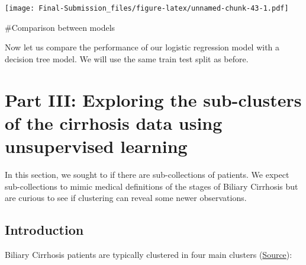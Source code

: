 \documentclass[
]{article}
\newenvironment{Shaded}{\begin{snugshade}}{\end{snugshade}}
\newcommand{\AttributeTok}[1]{\textcolor[rgb]{0.13,0.29,0.53}{#1}}
\newcommand{\CommentTok}[1]{\textcolor[rgb]{0.56,0.35,0.01}{\textit{#1}}}
\newcommand{\ConstantTok}[1]{\textcolor[rgb]{0.56,0.35,0.01}{#1}}
\newcommand{\DecValTok}[1]{\textcolor[rgb]{0.00,0.00,0.81}{#1}}
\newcommand{\FunctionTok}[1]{\textcolor[rgb]{0.13,0.29,0.53}{\textbf{#1}}}
\newcommand{\NormalTok}[1]{#1}
\newcommand{\SpecialCharTok}[1]{\textcolor[rgb]{0.81,0.36,0.00}{\textbf{#1}}}
\newcommand{\StringTok}[1]{\textcolor[rgb]{0.31,0.60,0.02}{#1}}
\begin{document}
\begin{Shaded}
\end{Shaded}

\texttt{[image: Final-Submission\_files/figure-latex/unnamed-chunk-43-1.pdf]}

\#Comparison between models

Now let us compare the performance of our logistic regression model with
a decision tree model. We will use the same train test split as before.

\hypertarget{part-iii-exploring-the-sub-clusters-of-the-cirrhosis-data-using-unsupervised-learning}{%
\section{Part III: Exploring the sub-clusters of the cirrhosis data
using unsupervised
learning}\label{part-iii-exploring-the-sub-clusters-of-the-cirrhosis-data-using-unsupervised-learning}}

In this section, we sought to if there are sub-collections of patients.
We expect sub-collections to mimic medical definitions of the stages of
Biliary Cirrhosis but are curious to see if clustering can reveal some
newer observations.

\hypertarget{introduction-2}{%
\subsection{Introduction}\label{introduction-2}}

Biliary Cirrhosis patients are typically clustered in four main clusters
(\href{https://www.healthline.com/health/primary-biliary-cirrhosis\#stages}{Source}):
\end{document}
